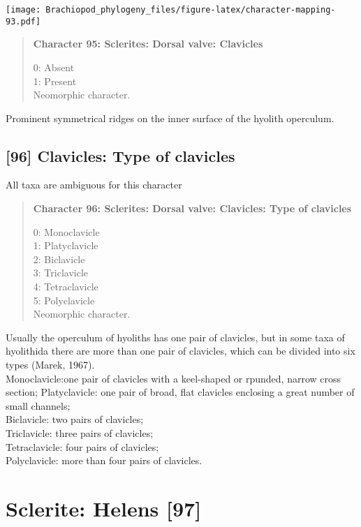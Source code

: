 \documentclass[openany]{book}
\theoremstyle{definition}
\theoremstyle{definition}
\theoremstyle{definition}
\theoremstyle{remark}
\begin{document}
\texttt{[image: Brachiopod\_phylogeny\_files/figure-latex/character-mapping-93.pdf]}

\begin{quote}
\textbf{Character 95: Sclerites: Dorsal valve: Clavicles}

0: Absent\\
1: Present\\
Neomorphic character.
\end{quote}

Prominent symmetrical ridges on the inner surface of the hyolith
operculum.

\subsection*{{[}96{]} Clavicles: Type of
clavicles}\label{clavicles-type-of-clavicles}

All taxa are ambiguous for this character

\begin{quote}
\textbf{Character 96: Sclerites: Dorsal valve: Clavicles: Type of
clavicles}

0: Monoclavicle\\
1: Platyclavicle\\
2: Biclavicle\\
3: Triclavicle\\
4: Tetraclavicle\\
5: Polyclavicle\\
Neomorphic character.
\end{quote}

Usually the operculum of hyoliths has one pair of clavicles, but in some
taxa of hyolithida there are more than one pair of clavicles, which can
be divided into six types (Marek, 1967).\\
Monoclavicle:one pair of clavicles with a keel-shaped or rpunded, narrow
cross section; Platyclavicle: one pair of broad, flat clavicles
enclosing a great number of small channels;\\
Biclavicle: two pairs of clavicles;\\
Triclavicle: three pairs of clavicles;\\
Tetraclavicle: four pairs of clavicles;\\
Polyclavicle: more than four pairs of clavicles.

\section{Sclerite: Helens {[}97{]}}\label{sclerite-helens-97}
\end{document}
